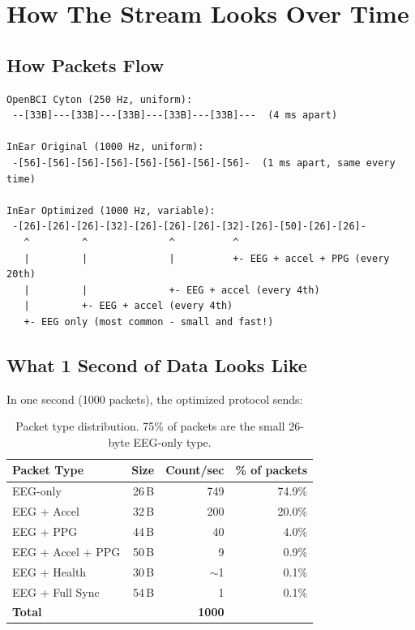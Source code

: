 \documentclass[11pt,a4paper]{article}
\begin{document}
\section{How The Stream Looks Over Time}
\label{sec:stream-behavior}

\subsection{How Packets Flow}

\begin{lstlisting}[style=diagram, caption={Packet timing comparison}]
OpenBCI Cyton (250 Hz, uniform):
 --[33B]---[33B]---[33B]---[33B]---[33B]---  (4 ms apart)

InEar Original (1000 Hz, uniform):
 -[56]-[56]-[56]-[56]-[56]-[56]-[56]-[56]-  (1 ms apart, same every time)

InEar Optimized (1000 Hz, variable):
 -[26]-[26]-[26]-[32]-[26]-[26]-[26]-[32]-[26]-[50]-[26]-[26]-
   ^         ^              ^          ^
   |         |              |          +- EEG + accel + PPG (every 20th)
   |         |              +- EEG + accel (every 4th)
   |         +- EEG + accel (every 4th)
   +- EEG only (most common - small and fast!)
\end{lstlisting}

\subsection{What 1 Second of Data Looks Like}

In one second (1000 packets), the optimized protocol sends:

\begin{table}[H]
\centering
\begin{tabular}{|l|r|r|r|}
\hline
\textbf{Packet Type} & \textbf{Size} & \textbf{Count/sec} & \textbf{\% of packets} \\\hline
\hline
EEG-only & 26\,B & 749 & 74.9\% \\
EEG + Accel & 32\,B & 200 & 20.0\% \\
EEG + PPG & 44\,B & 40 & 4.0\% \\
EEG + Accel + PPG & 50\,B & 9 & 0.9\% \\
EEG + Health & 30\,B & ${\sim}$1 & 0.1\% \\
EEG + Full Sync & 54\,B & 1 & 0.1\% \\
\hline
\textbf{Total} & & \textbf{1000} & \\
\hline
\end{tabular}
\caption{Packet type distribution. 75\% of packets are the small 26-byte EEG-only type.}
\end{table}
\end{document}
